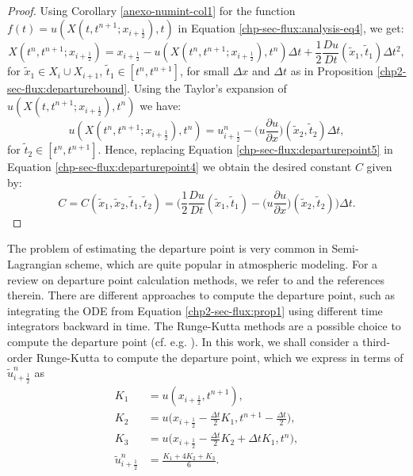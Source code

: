 \begin{proof}
Using Corollary \ref{anexo-numint-col1} for the function $f(t) = u(X(t,t^{n+1};x_{i+\frac{1}{2}}),t)$
in Equation  \eqref{chp-sec-flux:analysis-eq4}, we get:
\begin{equation}
	\label{chp-sec-flux:departurepoint4}
	X(t^n,t^{n+1};x_{i+\frac{1}{2}}) = x_{i+\frac{1}{2}} - u(X(t^n,t^{n+1};x_{i+\frac{1}{2}}),t^n)\Delta t + \frac{1}{2}\frac{Du}{Dt}(\tilde{x}_1,\tilde{t}_1)\Delta t^2,
\end{equation}
for $\tilde{x}_1 \in X_i \cup X_{i+1}$, $\tilde{t}_1 \in [t^n, t^{n+1}]$, for small $\Delta x$ and $\Delta t$ as in Proposition \ref{chp2-sec-flux:departurebound}.
Using the Taylor's expansion of $u(X(t,t^{n+1};x_{i+\frac{1}{2}}),t^n)$ we have:
\begin{equation}
	\label{chp-sec-flux:departurepoint5}
	u(X(t^n,t^{n+1};x_{i+\frac{1}{2}}),t^n) = u^n_{i+\frac{1}{2}} - \bigg(u\frac{\partial u}{\partial x}\bigg)(\tilde{x}_2,\tilde{t}_2)\Delta t,
\end{equation}
for $\tilde{t}_2 \in [t^n, t^{n+1}]$.
Hence, replacing Equation \eqref{chp-sec-flux:departurepoint5} in Equation \eqref{chp-sec-flux:departurepoint4} 
we obtain the desired constant $C$ given by:
\begin{equation}
	\label{chp-sec-flux:departurepoint6}
	C =  C(\tilde{x}_1, \tilde{x}_2, \tilde{t}_1, \tilde{t}_2) = 
	\bigg( \frac{1}{2}\frac{Du}{Dt}(\tilde{x}_1,\tilde{t}_1) - \bigg(u\frac{\partial u}{\partial x}\bigg)(\tilde{x}_2,\tilde{t}_2)\bigg)\Delta t.
\end{equation}
\end{proof}
The problem of estimating the departure point is very common in Semi-Lagrangian scheme, which are quite popular in 
atmospheric modeling.
For a review on departure point calculation methods, we refer to  \citet[Chapter 3]{tumolo:2011} and the references therein. 
There are different approaches to compute the departure point, such as integrating the ODE from Equation \ref{chp2-sec-flux:prop1}
using different time integrators \citep{durran:2011} backward in time.
The Runge-Kutta methods are a possible choice to compute the departure point (cf. e.g. \citet{lu:2022}). In this work,
we shall consider a third-order Runge-Kutta to compute the departure point, which we express in terms of $\tilde{u}^n_{i+\frac{1}{2}}$ as
\begin{align}
	\label{chp-sec-flux:dp_RK3}		
	K_1 &= u(x_{i+\frac{1}{2}},t^{n+1}), \nonumber \\
	K_2 &= u\big(x_{i+\frac{1}{2}}-\frac{\Delta t}{2}K_1,t^{n+1}-\frac{\Delta t}{2}\big), \nonumber \\
	K_3 &= u\big(x_{i+\frac{1}{2}}-\frac{\Delta t}{2}K_2+{\Delta t}K_1,t^{n}\big), \nonumber\\
	\tilde{u}^n_{i+\frac{1}{2}} &= \frac{K_1+4K_2+K_3}{6}.
\end{align}
